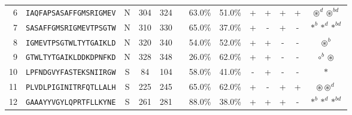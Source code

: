 \begin{tabular}{rcccccccccccc}
6  &  \texttt{IAQFAPSASAFFGMSRIGMEV} &       N &    304 &   324 &                                                                  &                          63.0\% &                           51.0\% &          + &           + &          + &           + &                                                                                                 $ \circledast^d \circledast^{bd} $ \\
7  &  \texttt{SASAFFGMSRIGMEVTPSGTW} &       N &    310 &   330 &                                                                  &                          65.0\% &                           37.0\% &          + &           - &          + &           - &                                                                                                        $ \ast^b \ast^d \ast^{bd} $ \\
8  &  \texttt{IGMEVTPSGTWLTYTGAIKLD} &       N &    320 &   340 &                                                                  &                          54.0\% &                           52.0\% &          + &           + &          - &           - &                                                                                                                  $ \circledast^b $ \\
9  &  \texttt{GTWLTYTGAIKLDDKDPNFKD} &       N &    328 &   348 &                                                                  &                          26.0\% &                           62.0\% &          + &           + &          - &           - &                                                                                                            $ \circ^b \circledast $ \\
10 &  \texttt{LPFNDGVYFASTEKSNIIRGW} &       S &     84 &   104 &                                                                  &                          58.0\% &                           41.0\% &          - &           + &          - &           - &                                                                                                                           $ \ast $ \\
11 &  \texttt{PLVDLPIGINITRFQTLLALH} &       S &    225 &   245 &                                                                  &                          65.0\% &                           62.0\% &          + &           - &          + &           + &                                                                                                      $ \circledast \circledast^d $ \\
12 &  \texttt{GAAAYYVGYLQPRTFLLKYNE} &       S &    261 &   281 &                                                                  &                          88.0\% &                           38.0\% &          + &           + &          + &           - &                                                                                                        $ \ast^b \ast^d \ast^{bd} $ \\

\end{tabular}
